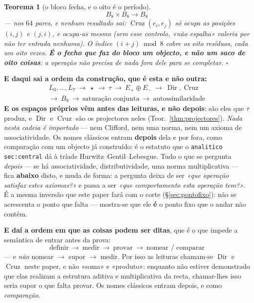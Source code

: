\documentclass[11pt,a4paper]{article}
\newtheorem{teorema}{Teorema}
\newcommand{\code}[1]{\texttt{\small #1}}
\begin{document}
\begin{teorema}[o bloco fecha, e o oito é o período]\label{thm:bloco}
\[
\boxed{\;B_8\times B_8\longrightarrow B_8\;}
\]
--- nos $64$ pares, e nenhum resultado sai: $\operatorname{Cruz}(e_i,e_j)$ só ocupa as
posições $(i,j)$ e $(j,i)$, e ocupa-as mesmo (sem esse controlo, «não espalha» valeria por
não ter entrada nenhuma). O índice $(i+j)\bmod 8$ cobre os oito resíduos, cada um oito
vezes. \textbf{É o fecho que faz do bloco um objecto, e não um saco de oito coisas}: a
operação não precisa de nada fora dele para se completar. $\square$
\end{teorema}

\medskip
\noindent\textbf{E daqui sai a ordem da construção, que é esta e não outra:}
\[
\boxed{\;\begin{gathered}
L_0,\ldots,L_7
\ \longrightarrow\ \star
\ \longrightarrow\ \tau
\ \longrightarrow\ E_{+}\oplus E_{-}
\ \longrightarrow\ \operatorname{Dir},\operatorname{Cruz}\\[3pt]
\longrightarrow\ B_8
\ \longrightarrow\ \text{saturação conjunta}
\ \longrightarrow\ \text{autossimilaridade}
\end{gathered}\;}
\]
\textbf{E os espaços próprios vêm antes das leituras, e não depois}: são eles que $\tau$
produz, e $\operatorname{Dir}$ e $\operatorname{Cruz}$ são os projectores neles
(Teor.~\ref{thm:projectores}). \emph{Nada nesta cadeia é importado} --- nem Clifford, nem
uma norma, nem um axioma de associatividade. Os nomes clássicos entram
\textbf{depois} dela e por fora, como comparação com um objecto já construído: é o
estatuto que o \code{analitico sec:central} dá à tríade Hurwitz--Gentil--Lebesgue.
Tudo o que se pergunta \emph{depois} --- se há associatividade, distributividade, uma
norma multiplicativa --- fica \textbf{abaixo} disto, e muda de forma: a pergunta deixa de
ser \emph{«que operação satisfaz estes axiomas?»} e passa a ser \emph{«que comportamento
esta operação tem?»}. É a mesma inversão que este paper fará com o corte
(\S\ref{sec:pontofixo}): não se acrescenta o ponto que falta --- mostra-se que ele
\textbf{é} o ponto fixo que o andar não contém.

\medskip
\noindent\textbf{E daí a ordem em que as coisas podem ser ditas}, que é o que impede a
semântica de entrar antes da prova:
\[
\boxed{\;\text{definir}\ \to\ \text{medir}\ \to\ \text{provar}\ \to\
\text{nomear / comparar}\;}
\]
--- e \emph{não} nomear $\to$ supor $\to$ medir. Por isso as leituras chamam-se
$\operatorname{Dir}$ e $\operatorname{Cruz}$ neste paper, e não «soma» e «produto»:
enquanto não estiver demonstrado que elas realizam a estrutura aditiva e multiplicativa
da recta, chamar-lhes isso seria supor o que falta provar. Os nomes clássicos entram
depois, e como \emph{comparação}.
\end{document}
